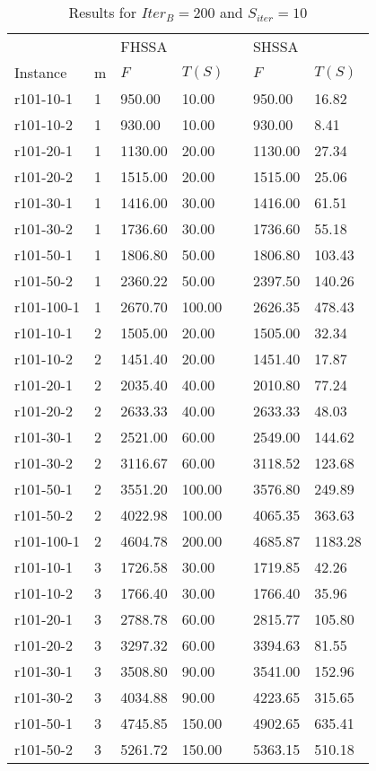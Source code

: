 \documentclass[final,5p,times,twocolumn]{elsarticle}
\begin{document}
{{{{{{{{\renewcommand{\arraystretch}{1.2}
\begin{table}[htbp]
\centering
\caption{Results for $Iter_{B}=200$ and $S_{iter}=10$}
\centering
\begin{tabular}{l l l l l l l}
\hline 
&&\multicolumn{2}{l}{FHSSA}&& \multicolumn{2}{l}{SHSSA}\\
\cline{3-4}\cline{6-7}
Instance & m & $F$ & $T(S)$ && $F$ & $T(S)$\\
\hline
r101-10-1&1&950.00&10.00&&950.00&16.82\\
r101-10-2&1&930.00&10.00&&930.00&8.41\\
r101-20-1&1&1130.00&20.00&&1130.00&27.34\\
r101-20-2&1&1515.00&20.00&&1515.00&25.06\\
r101-30-1&1&1416.00&30.00&&1416.00&61.51\\
r101-30-2&1&1736.60&30.00&&1736.60&55.18\\
r101-50-1&1&1806.80&50.00&&1806.80&103.43\\
r101-50-2&1&2360.22&50.00&&2397.50&140.26\\
r101-100-1&1&2670.70&100.00&&2626.35&478.43\\
r101-10-1&2&1505.00&20.00&&1505.00&32.34\\
r101-10-2&2&1451.40&20.00&&1451.40&17.87\\
r101-20-1&2&2035.40&40.00&&2010.80&77.24\\
r101-20-2&2&2633.33&40.00&&2633.33&48.03\\
r101-30-1&2&2521.00&60.00&&2549.00&144.62\\
r101-30-2&2&3116.67&60.00&&3118.52&123.68\\
r101-50-1&2&3551.20&100.00&&3576.80&249.89\\
r101-50-2&2&4022.98&100.00&&4065.35&363.63\\
r101-100-1&2&4604.78&200.00&&4685.87&1183.28\\
r101-10-1&3&1726.58&30.00&&1719.85&42.26\\
r101-10-2&3&1766.40&30.00&&1766.40&35.96\\
r101-20-1&3&2788.78&60.00&&2815.77&105.80\\
r101-20-2&3&3297.32&60.00&&3394.63&81.55\\
r101-30-1&3&3508.80&90.00&&3541.00&152.96\\
r101-30-2&3&4034.88&90.00&&4223.65&315.65\\
r101-50-1&3&4745.85&150.00&&4902.65&635.41\\
r101-50-2&3&5261.72&150.00&&5363.15&510.18\\

\end{tabular}
\end{table}}}}}}}}}
\end{document}
